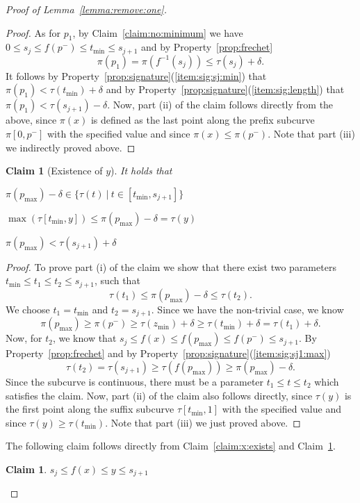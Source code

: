 \documentclass[11pt, letter]{article}
\newtheorem{claim}[theorem]{Claim}
\newcommand{\lemref}[1]{Lemma~\ref{lemma:#1}}
\newcommand{\claimlab}[1]{\label{claim:#1}}
\newcommand{\claimref}[1]{Claim~\ref{claim:#1}}
\newcommand{\propref}[1]{Property~\ref{prop:#1}}
\newcommand{\maxSubC}[4]{\ensuremath{\max( #1[#3,#4])}}
\begin{document}
\begin{proof}[Proof of \lemref{remove:one}]
\begin{proof}
As for $p_1$, by \claimref{no:minimum} we have $0\leq s_j \leq f(p^{-}) \leq t_{\min} \leq s_{j+1}$ and 
by \propref{frechet} 
\[\pi(p_1) =\pi(f^{-1}(s_j)) \leq \tau(s_j) +\delta .\]
It follows by \propref{signature}(\ref{item:sig:sj:min}) that 
$\pi(p_1) < \tau(t_{\min}) + \delta$
and by \propref{signature}(\ref{item:sig:length}) that 
$\pi(p_1)  < \tau(s_{j+1})-\delta.$
Now, part (ii) of the claim follows directly from the above,
since $\pi(x)$ is defined as the last point along the prefix subcurve 
$\pi[0,p^{-}]$ with the specified value and since $\pi(x) \leq \pi(p^{-})$.
Note that part (iii) we indirectly proved above. 
\end{proof}


\begin{claim}[Existence of $y$] It holds that
\begin{compactenum}[(i)]
\item $ \pi(p_{\max}) - \delta  \in \{\tau(t) ~|~ t \in [t_{\min},s_{j+1}]\}$
\item $\maxSubC{\tau}{t}{t_{\min}}{y} \leq \pi(p_{\max}) - \delta =\tau(y)$
\item $\pi(p_{\max}) < \tau(s_{j+1}) + \delta$
\end{compactenum}
\claimlab{y:exists}
\claimlab{sj1:high}
\end{claim}
\begin{proof}
To prove part (i) of the claim we show that there exist two parameters
$t_{\min} \leq t_1 \leq t_2 \leq s_{j+1}$,
such that 
\[\tau(t_1)\leq  \pi(p_{\max})-\delta \leq \tau(t_2). \]
We choose $t_1=t_{\min}$ and $t_2=s_{j+1}$.
Since we have the non-trivial case, we know 
\[ \pi(p_{\max}) \geq \pi(p^{-}) \geq \tau(z_{\min})+\delta \geq \tau(t_{\min})+\delta = \tau(t_1)+\delta.\]
Now, for $t_2$, we know that $s_j \leq f(x) \leq f(p_{\max}) \leq f(p^{-}) \leq s_{j+1}$.
By \propref{frechet} and by \propref{signature}(\ref{item:sig:sj1:max})
\[\tau(t_2) = \tau(s_{j+1}) \geq \tau(f(p_{\max})) \geq \pi(p_{\max})-\delta. \] 
Since the subcurve is continuous, there must be a parameter $t_1\leq t\leq
t_2$ which satisfies the claim.
Now, part (ii) of the claim also follows directly, since $\tau(y)$ is the first point along the suffix subcurve
$\tau[t_{\min},1]$ with the specified value and since $\tau(y) \geq \tau(t_{\min})$.
Note that part (iii) we just proved above.
\end{proof}

The following claim follows directly from \claimref{x:exists} and \claimref{y:exists}.
\begin{claim}
$s_j \leq f(x) \leq y \leq s_{j+1}$
\claimlab{xy:inside}
\end{claim}


\end{proof}
\end{document}
